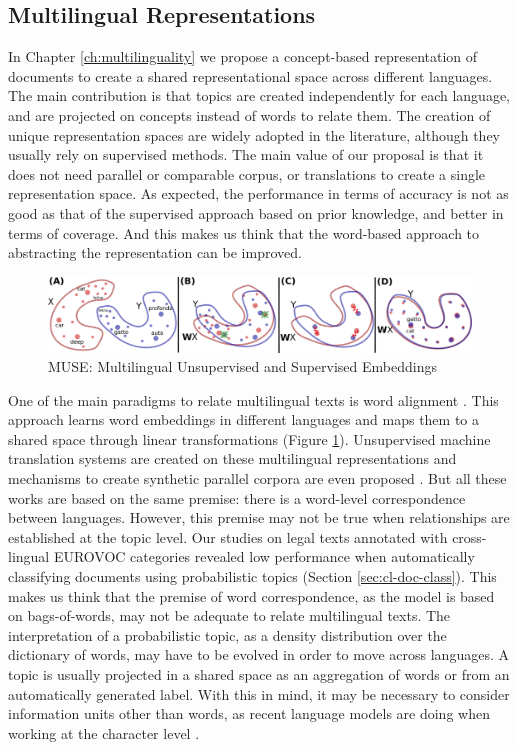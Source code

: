 \subsection{Multilingual Representations}

In Chapter \ref{ch:multilinguality} we propose a concept-based representation of documents to create a shared representational space across different languages. The main contribution is that topics are created independently for each language, and are projected on concepts instead of words to relate them. The creation of unique representation spaces are widely adopted in the literature, although they usually rely on supervised methods. The main value of our proposal is that it does not need parallel or comparable corpus, or translations to create a single representation space. As expected, the performance in terms of accuracy is not as good as that of the supervised approach based on prior knowledge, and better in terms of coverage. And this makes us think that the word-based approach to abstracting the representation can be improved.

\begin{figure}[ht]
    \centering
    \includegraphics[width=\linewidth]{muse.png}
    \caption{MUSE: Multilingual Unsupervised and Supervised Embeddings \citep{Lample2018}}
    \label{fig:muse}
\end{figure}


One of the main paradigms to relate multilingual texts is word alignment \citep{joulin2018loss, Lample2018}. This approach learns word embeddings in different languages and maps them to a shared space through linear transformations (Figure \ref{fig:muse}). Unsupervised machine translation systems are created on these multilingual representations and mechanisms to create synthetic parallel corpora are even proposed \citep{artetxe2019}. But all these works are based on the same premise: there is a word-level correspondence between languages. However, this premise may not be true when relationships are established at the topic level. Our studies on legal texts annotated with cross-lingual EUROVOC categories revealed low performance when automatically classifying documents using probabilistic topics (Section \ref{sec:cl-doc-class}). This makes us think that the premise of word correspondence, as the model is based on bags-of-words, may not be adequate to relate multilingual texts. The interpretation of a probabilistic topic, as a density distribution over the dictionary of words, may have to be evolved in order to move across languages. A topic is usually projected in a shared space as an aggregation of words or from an automatically generated label. With this in mind, it may be necessary to consider information units other than words, as recent language models are doing when working at the character level \citep{Al-Rfou_Choe_Constant_Guo_Jones_2019}.


